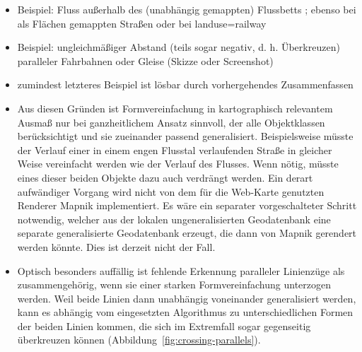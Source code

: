 \documentclass[../main/thesis.tex]{subfiles}
\begin{document}
\begin{itemize}

\item Beispiel: Fluss außerhalb des (unabhängig gemappten) Flussbetts ; ebenso bei als Flächen gemappten Straßen oder bei landuse=railway
\item Beispiel: ungleichmäßiger Abstand (teils sogar negativ, d. h. Überkreuzen) paralleler Fahrbahnen oder Gleise (Skizze oder Screenshot)

\item zumindest letzteres Beispiel ist lösbar durch vorhergehendes Zusammenfassen

\item Aus diesen Gründen ist Formvereinfachung in kartographisch relevantem Ausmaß nur bei ganzheitlichem Ansatz sinnvoll, der alle Objektklassen berücksichtigt und sie zueinander passend generalisiert.
Beispielsweise müsste der Verlauf einer in einem engen Flusstal verlaufenden Straße in gleicher Weise vereinfacht werden wie der Verlauf des Flusses.
Wenn nötig, müsste eines dieser beiden Objekte dazu auch verdrängt werden. 
Ein derart aufwändiger Vorgang wird nicht von dem für die Web-Karte genutzten Renderer Mapnik implementiert.
Es wäre ein separater vorgeschalteter Schritt notwendig, welcher aus der lokalen ungeneralisierten Geodatenbank eine separate generalisierte Geodatenbank erzeugt, die dann von Mapnik gerendert werden könnte.
Dies ist derzeit nicht der Fall.


\item Optisch besonders auffällig ist fehlende Erkennung paralleler Linienzüge als zusammengehörig, wenn sie einer starken Formvereinfachung unterzogen werden.
Weil beide Linien dann unabhängig voneinander generalisiert werden, kann es abhängig vom eingesetzten Algorithmus zu unterschiedlichen Formen der beiden Linien kommen, die sich im Extremfall sogar gegenseitig überkreuzen können (Abbildung~\ref{fig:crossing-parallels}).

\end{itemize}
\end{document}
